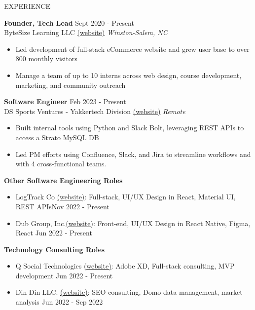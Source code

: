 \documentclass{resume} %
\begin{document}
\begin{rSection}{EXPERIENCE}

\textbf{Founder, Tech Lead} \hfill Sept 2020 - Present\\
ByteSize Learning LLC \href{https://www.bytesizelearning.org/}{(website)} \hfill \textit{Winston-Salem, NC}
 \begin{itemize}
    \itemsep -2pt {} 
     \item Led development of full-stack eCommerce website and grew user base to over 800 monthly visitors
     \item Manage a team of up to 10 interns across web design, course development, marketing, and community outreach  
 \end{itemize}
 
\textbf{Software Engineer} \hfill Feb 2023 - Present\\
DS Sports Ventures - Yakkertech Division \href{https://www.yakkertech.com/}{(website)} \hfill \textit{Remote}
 \begin{itemize}
    \itemsep -2pt {} 
     \item Built internal tools using Python and Slack Bolt, leveraging REST APIs to access a Strato MySQL DB
     \item Led PM efforts using Confluence, Slack, and Jira to streamline workflows and with 4 cross-functional teams.
 \end{itemize}

\textbf{Other Software Engineering Roles}
 \begin{itemize}
    \itemsep -2pt {} 
     \item LogTrack Co \href{https://www.thelogtrack.com/}{(website)}: Full-stack, UI/UX Design in React, Material UI, REST APIs\hfill Nov 2022 - Present
     \item Dub Group, Inc.\href{https://letswhirl.com/}{(website)}: Front-end, UI/UX Design in React Native, Figma, React \hfill Jun 2022 - Present
 \end{itemize}

\textbf{Technology Consulting Roles}
 \begin{itemize}
    \itemsep -2pt {} 
     \item Q Social Technologies \href{https://www.q-social.com/}{(website)}: Adobe XD, Full-stack consulting, MVP development \hfill Jun 2022 - Present
     \item Din Din LLC. \href{https://www.eatdindin.com/landing-page}{(website)}: SEO consulting, Domo data management, market analysis \hfill Jun 2022 - Sep 2022
 \end{itemize}

\end{rSection} 
\end{document}
